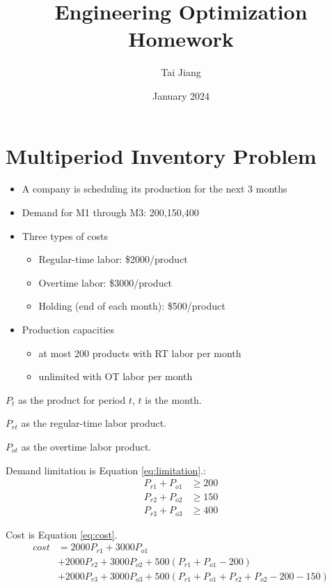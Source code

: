 \documentclass{article}
\title{Engineering Optimization Homework}
\author{Tai Jiang}
\date{January 2024}
\begin{document}
  \maketitle
  \section{Multiperiod Inventory Problem}
  \begin{itemize}
    \item A company is scheduling its production for the next 3 months
    \item Demand for M1 through M3: 200,150,400
    \item Three types of costs
    \begin{itemize}
      \item Regular-time labor: \$2000/product
      \item Overtime labor: \$3000/product
      \item Holding (end of each month): \$500/product
    \end{itemize}
    \item Production capacities
    \begin{itemize}
      \item at most 200 products with RT labor per month
      \item unlimited with OT labor per month
    \end{itemize}
  \end{itemize}

  $P_t$ as the product for period $t$, $t$ is the month.

  $P_{rt}$ as the regular-time labor product.

  $P_{ot}$ as the overtime labor product.

  Demand limitation is Equation \ref{eq:limitation}.:
  \begin{equation}
    \begin{aligned}
      P_{r1} + P_{o1} &\geq 200 \\
      P_{r2} + P_{o2} &\geq 150 \\
      P_{r3} + P_{o3} &\geq 400
    \end{aligned}
    \label{eq:limitation}
  \end{equation}

  Cost is Equation \ref{eq:cost}.
  \begin{equation}
    \begin{aligned}
      cost  &= 2000 P_{r1} + 3000 P_{o1} \\
            &+ 2000 P_{r2} + 3000 P_{o2} + 500 (P_{r1} + P_{o1} - 200) \\
            &+ 2000 P_{r3} + 3000 P_{o3} + 500 (P_{r1} + P_{o1} + P_{r2} + P_{o2} - 200 - 150)
    \end{aligned}
    \label{eq:cost}
  \end{equation}
\end{document}
